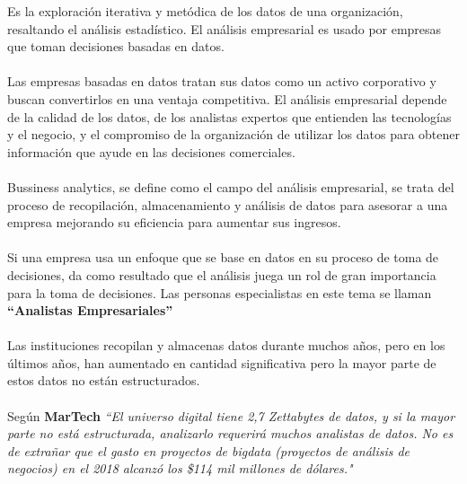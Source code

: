 \documentclass[twoside,twocolumn]{article}
\begin{document}
Es la exploración iterativa y metódica de los datos de una organización, resaltando el análisis estadístico. El análisis empresarial es usado por empresas que toman decisiones basadas en datos. 
\\ \\
Las empresas basadas en datos tratan sus datos como un activo corporativo y buscan convertirlos en una ventaja competitiva. El análisis empresarial depende de la calidad de los datos, de los analistas expertos que entienden las tecnologías y el negocio, y el compromiso de la organización de utilizar los datos para obtener información que ayude en las decisiones comerciales.
\\ \\
Bussiness analytics, se define como el campo del análisis empresarial, se trata del proceso de recopilación, almacenamiento y análisis de datos para asesorar a una empresa mejorando su eficiencia para aumentar sus ingresos.
\\ \\
Si una empresa usa un enfoque que se base en datos en su proceso de toma de decisiones, da como resultado que el análisis juega un rol de gran importancia para la toma de decisiones.  Las personas especialistas en este tema se llaman \textbf{ “Analistas Empresariales”}
\\ \\
Las instituciones recopilan y almacenas datos durante muchos años, pero en los últimos años, han aumentado en cantidad significativa pero la mayor parte de estos datos no están estructurados.  
\\ \\
Según \textbf{MarTech}
\textsl{“El universo digital tiene 2,7 Zettabytes de datos, y si la mayor parte no está estructurada, analizarlo requerirá muchos analistas de datos.  No es de extrañar que el gasto en proyectos de bigdata (proyectos de análisis de negocios) en el 2018 alcanzó los \$114 mil millones de dólares."}
\end{document}
